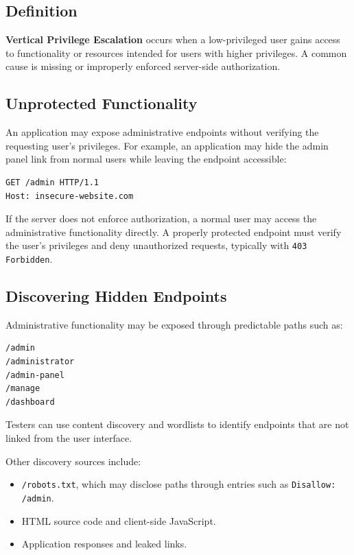 \documentclass[11pt,a4paper]{article}
\begin{document}
\subsection{Definition}

\textbf{Vertical Privilege Escalation} occurs when a low-privileged user gains access to functionality or resources intended for users with higher privileges.
A common cause is missing or improperly enforced server-side authorization.

\subsection{Unprotected Functionality}

An application may expose administrative endpoints without verifying the requesting user's privileges.
For example, an application may hide the admin panel link from normal users while leaving the endpoint accessible:

\begin{lstlisting}[language=HTTP]
GET /admin HTTP/1.1
Host: insecure-website.com
\end{lstlisting}

If the server does not enforce authorization, a normal user may access the administrative functionality directly. A properly protected endpoint must verify the user's privileges and deny unauthorized requests, typically with \texttt{403 Forbidden}.

\subsection{Discovering Hidden Endpoints}

Administrative functionality may be exposed through predictable paths such as:
\begin{lstlisting}
/admin
/administrator
/admin-panel
/manage
/dashboard
\end{lstlisting}

Testers can use content discovery and wordlists to identify endpoints that are not linked from the user interface.

Other discovery sources include:
\begin{itemize}
    \item \texttt{/robots.txt}, which may disclose paths through entries such as \texttt{Disallow: /admin}.
    \item HTML source code and client-side JavaScript.
    \item Application responses and leaked links.
\end{itemize}
\end{document}
